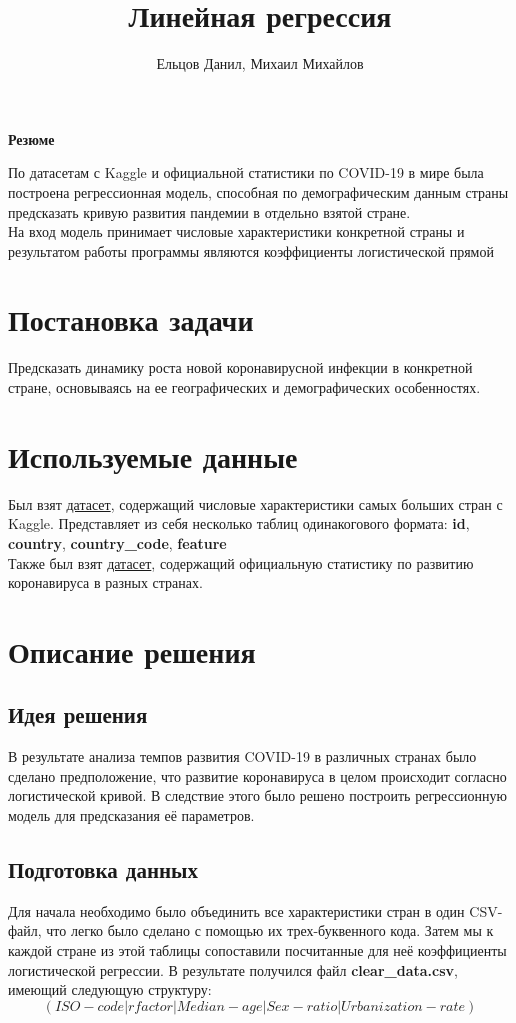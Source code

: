 \documentclass[a4paper]{article}
\title{Линейная регрессия}
\author{Ельцов Данил, Михаил Михайлов}
\begin{document}
\maketitle

\tableofcontents

\Large \textbf{Резюме}
\par По датасетам с Kaggle и официальной статистики по COVID-19 в мире была построена регрессионная модель, способная по демографическим данным страны предсказать кривую развития
пандемии в отдельно взятой стране.\\
На вход модель принимает числовые характеристики конкретной страны и результатом работы программы являются коэффициенты логистической прямой
\clearpage

\section{Постановка задачи}
Предсказать динамику роста новой коронавирусной инфекции в конкретной стране, основываясь на ее географических и демографических особенностях. 
\section{Используемые данные}
Был взят \href{https://www.kaggle.com/daniboy370/world-data-by-country-2020}{датасет}, содержащий числовые характеристики самых больших стран с Kaggle. Представляет из себя несколько таблиц одинакогового формата: \textbf{id}, \textbf{country}, \textbf{country\_code}, \textbf{feature}\\
Также был взят \href{https://www.ecdc.europa.eu/en/publications-data/download-todays-data-geographic-distribution-covid-19-cases-worldwide}{датасет}, содержащий официальную статистику по развитию коронавируса в разных странах.
\section{Описание решения}
\subsection{Идея решения}
В результате анализа темпов развития COVID-19 в различных странах было сделано предположение, что развитие коронавируса в целом происходит согласно логистической кривой. В следствие этого было решено построить регрессионную модель для предсказания её параметров.
\subsection{Подготовка данных}
Для начала необходимо было объединить все характеристики стран в один CSV-файл, что легко было сделано с помощью их трех-буквенного кода. Затем мы к каждой стране из этой таблицы сопоставили посчитанные для неё коэффициенты логистической регрессии. В результате получился файл \textbf{clear\_data.csv}, имеющий следующую структуру:
\[(ISO-code|rfactor|Median-age|Sex-ratio|Urbanization -rate)\]
\end{document}
